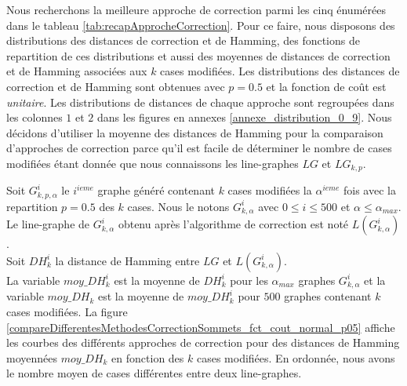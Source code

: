 
Nous recherchons la meilleure approche de correction parmi les cinq  \'enum\'er\'ees dans le tableau \ref{tab:recapApprocheCorrection}.
Pour ce faire, nous disposons des distributions des distances de correction et de Hamming, des fonctions de repartition de ces distributions et aussi des moyennes de distances de correction et de Hamming associ\'ees aux $k$ cases modifi\'ees. Les distributions des distances de correction et de Hamming sont obtenues avec  $p=0.5$ et la fonction de co\^ut est {\em unitaire}.
Les distributions de distances de chaque approche sont regroup\'ees dans les colonnes $1$ et $2$ dans les figures en annexes \ref{annexe_distribution_0_9}.
Nous d\'ecidons d'utiliser la moyenne des distances de Hamming pour la comparaison d'approches de correction parce qu'il est facile de d\'eterminer le nombre de cases modifi\'ees \'etant donn\'ee que nous connaissons les line-graphes $LG$ et $LG_{k,p}$. 
\newline

%
Soit $G_{k,p,\alpha}^{i}$  le $i^{ieme}$  graphe g\'en\'er\'e contenant $k$ cases modifi\'ees la $\alpha^{ieme}$ fois avec la repartition $p=0.5$ des $k$ cases. Nous le notons $G_{k,\alpha}^{i}$ avec $ 0 \le i \le 500$ et $\alpha \le \alpha_{max}$. Le line-graphe de  $G_{k,\alpha}^{i}$ obtenu apr\`es l'algorithme de correction est not\'e $L(G_{k,\alpha}^{i})$. \\
Soit $DH_k^i$ la distance de Hamming entre $LG$ et $L(G_{k,\alpha}^{i})$.  \\
La variable $moy\_DH_{k}^{i}$ est la moyenne de $DH_k^i$ pour les $\alpha_{max}$ graphes $G_{k,\alpha}^{i}$ et la variable $moy\_DH_{k}$ est la moyenne de $moy\_DH_{k}^{i}$ pour $500$ graphes contenant $k$ cases modifi\'ees.
La figure \ref{compareDifferentesMethodesCorrectionSommets_fct_cout_normal_p05} affiche les courbes  des diff\'erents approches de correction pour des distances de Hamming moyenn\'ees $moy\_DH_{k}$ en fonction des $k$ cases modifi\'ees. En ordonn\'ee, nous avons le nombre moyen de cases diff\'erentes entre deux line-graphes. 
\newline

